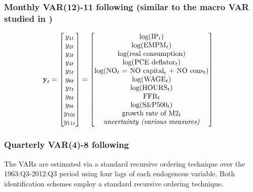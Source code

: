 \documentclass[a4paper,11pt,listof=nochaptergap,oneside,pointednumbers,bibtotoc,bigheadings,liststotoc,hidelinks]{scrbook}
\theoremstyle{mysatz}
\theoremstyle{mydefinition}
\theoremstyle{mytheorem}
\theoremstyle{mybemerkung}
\newcommand{\vect}[1]{\boldsymbol{\mathbf{#1}}}
\begin{document}
\subsubsection{Monthly VAR(12)-11 following \citet{juradoetal:15} (similar to the macro VAR studied in \citealp{christianoetal:05})}
\begin{equation} \label{eq:VAR19}
\begin{split}
\vect{y}_t & = 
 \begin{bmatrix} 
 		y_{1t} \\
		y_{2t} \\
		y_{3t} \\
		y_{4t} \\
		y_{5t} \\
		y_{6t} \\
		y_{7t} \\
		y_{8t} \\
		y_{9t} \\
		y_{10t} \\
		y_{11t}
	      \end{bmatrix} = 	      
	      \begin{bmatrix} \text{log($\text{IP}_t$)} \\ 
				      \text{log($\text{EMPM}_t$)}\\ 
				      \text{log(real consumption)}\\
				      \text{log($\text{PCE deflator}_t$)}\\
				      \text{log($\text{NO}_t$ $=$ $\text{NO capital}_t$ $+$ $\text{NO cons}_t$)}\\
				      \text{log($\text{WAGE}_t$)}\\
				      \text{log($\text{HOURS}_t$)}\\
				      \text{$\text{FFR}_t$} \\
				      \text{log($\text{S\&P500}_t$)} \\
				      \text{growth rate of $\text{M2}_t$} \\
				      \text{\textit{uncertainty (various measures)}}
	      \end{bmatrix}
\end{split}
\end{equation}

\subsubsection{Quarterly VAR(4)-8 following \citet{gilchristetal:14}}
The VARs are estimated via a standard recursive ordering technique over the 1963:Q3-2012:Q3 period using four lags of each endogenous variable. Both identification schemes employ a standard recursive ordering technique.\\
\end{document}
